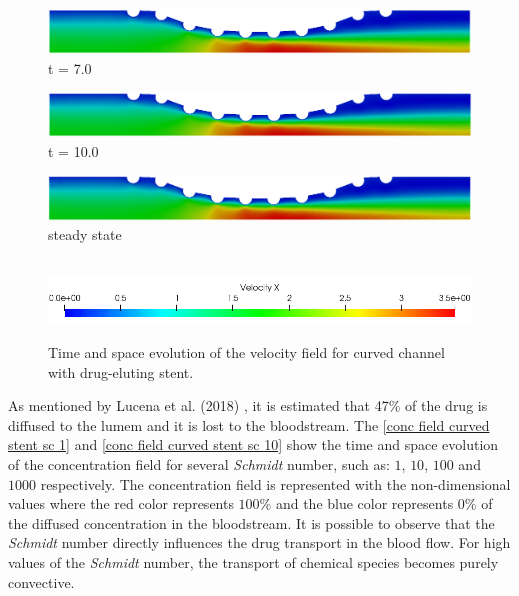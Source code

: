 \begin{figure}[H]
     \begin{minipage}{.50\linewidth}
      \centering
      \includegraphics[scale=0.18]{./02_chaps/cap_solution/figure/vel_CurvedStrut6.png}\\
      t = 7.0
     \end{minipage}
     \begin{minipage}{.50\linewidth}
     \medskip
      \centering
      \includegraphics[scale=0.18]{./02_chaps/cap_solution/figure/vel_CurvedStrut7.png}\\
      t = 10.0
     \end{minipage}%
     \begin{minipage}{.50\linewidth}
     \medskip
      \centering
      \includegraphics[scale=0.18]{./02_chaps/cap_solution/figure/vel_CurvedStrut8.png}\\
      steady state
     \end{minipage}\\[10pt]
      \centering
      \includegraphics[scale=0.5]{./02_chaps/cap_solution/figure/vel_CurvedStrutScale.png}\\
     \medskip
     \caption{
Time and space evolution of the velocity field for curved channel with
drug-eluting stent.}
     \label{velocity field curved stent}
\end{figure}


\vspace{1cm}
As mentioned by Lucena et al. (2018) \cite{lucena2018}, 
it is estimated that 47\% of the drug is diffused to the 
lumem and it is lost to the bloodstream.
The \ref{conc field curved stent sc 1} and 
\ref{conc field curved stent sc 10} show the time and space evolution 
of the concentration field for several \textit{Schmidt} number, 
such as: $1$, $10$, $100$ and $1000$ respectively. The concentration field is 
represented with the non-dimensional values where the red color 
represents $100$\% and the blue color represents $0$\% 
of the diffused concentration in the bloodstream. 
It is possible to observe that the \textit{Schmidt} number directly 
influences the drug transport in the blood flow. 
For high values of the \textit{Schmidt} number, 
the transport of chemical species becomes purely convective.



